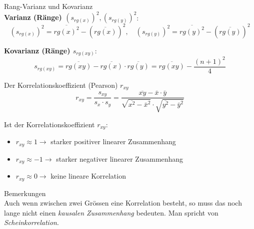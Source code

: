 \begin{definition}{Rang-Varianz und Kovarianz}\\
\textbf{Varianz (Ränge) $(s_{rg(x)})^2, (s_{rg(y)})^2$}:
$$(s_{rg(x)})^2 = \overline{rg(x)^2} - (\overline{rg(x)})^2, \quad (s_{rg(y)})^2 = \overline{rg(y)^2} - (\overline{rg(y)})^2$$

\textbf{Kovarianz (Ränge) $s_{rg(xy)}$}:
$$s_{rg(xy)} = \overline{rg(xy)} - \overline{rg(x)} \cdot \overline{rg(y)} = \overline{rg(xy)} - \frac{(n+1)^2}{4}$$
\end{definition}

\begin{definition}{Der Korrelationskoeffizient (Pearson) $r_{xy}$}\\
$$r_{xy} = \frac{s_{xy}}{s_x \cdot s_y} = \frac{\overline{xy} - \bar{x} \cdot \bar{y}}{\sqrt{\overline{x^2} - \bar{x}^2} \cdot \sqrt{\overline{y^2} - \bar{y}^2}}$$

Ist der Korrelationskoeffizient $r_{xy}$:
\begin{itemize}
  \item $r_{xy} \approx 1 \rightarrow$ starker positiver linearer Zusammenhang
  \item $r_{xy} \approx -1 \rightarrow$ starker negativer linearer Zusammenhang
  \item $r_{xy} \approx 0 \rightarrow$ keine lineare Korrelation
\end{itemize}
\end{definition}

\begin{remark}{Bemerkungen}\\
Auch wenn zwischen zwei Grössen eine Korrelation besteht, so muss das noch lange nicht einen \emph{kausalen Zusammenhang} bedeuten. Man spricht von \emph{Scheinkorrelation}.
\end{remark}

